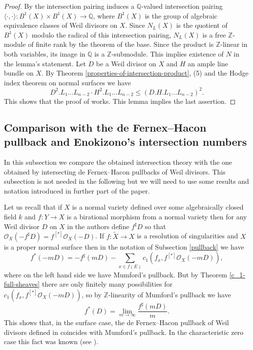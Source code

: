 \documentclass[twoside, 11pt]{article}
\theoremstyle{plain}
\theoremstyle{definition}
\theoremstyle{remark}
\newcommand{\ZZ}{{\mathbb Z}}
\newcommand{\QQ}{{\mathbb Q}}
\newcommand{\cO}{{\mathcal O}}
\begin{document}
\begin{proof}
By \cite[Lemma 1.18]{La4} the intersection pairing induces a $\QQ$-valued intersection pairing $\langle \cdot, \cdot \rangle : B^1(X)\times B^1(X)\to \QQ$, where $B^1(X)$ is the group of algebraic equivalence classes of Weil divisors on $X$. Since $N_L(X)$  is the quotient of $B^1 (X)$ modulo the radical of this intersection pairing, $N_L(X)$ is a free $\ZZ$-module of finite rank by the theorem of the base. Since the product is $\ZZ$-linear in both variables, its image in $\QQ$ is a $\ZZ$-submodule. This implies  existence of  $N$  in the lemma’s statement. 
Let $D$ be a Weil divisor on $X$ and $H$ an ample line bundle on $X$. By Theorem \ref{properties-of-intersection-product}, (5) and the Hodge index theorem on normal surfaces we have 
\[D^2.L_1...L_{n-2} \cdot H^2.L_1...L_{n-2}  \le (D.H.L_1...L_{n-2})^2.
\]
This shows that the proof of \cite[Lemma 1.19]{La4} works. This lemma implies the last assertion.  
\end{proof}

\subsection{Comparison with the de Fernex--Hacon pullback and Enokizono's intersection numbers}\label{deFernex-Hacon}

In this subsection we compare the obtained intersection theory with the one obtained by intersecting de Fernex--Hacon pullbacks of Weil divisors. This subsection is not needed in the following but we will need to use some results and notation introduced in further part of the paper.

Let us recall that if $X$ is a normal variety defined over some algebraically closed field $k$ and $f: Y\to X$ is a birational morphism from a normal variety then for any Weil divisor $D$ on $X$ in \cite[Definition 2.5]{dFH} the authors define $f^{\sharp}D$ so that $\cO_X (-f^{\sharp} D)=f^{[*]}\cO_X(-D)$.
If $f: \tilde X\to X$ is a resolution of singularities and $X$ is a proper normal surface then in
the notation of Subsection \ref{pullback} we have
$$f^*(-mD)=- f^{\sharp} (mD)-\sum _{x\in f(E)} c_1 (f_x, f^{[*]} \cO_X (-mD)), $$ 
where on the left hand side we have Mumford's pullback.
But by Theorem \ref{c_1-full-sheaves} there are only finitely many possibilities for $c_1 (f_x, f^{[*]} \cO_X (-mD))$,
so by $\ZZ$-linearity of Mumford's pullback we have
$$f^*(D)=\lim _{m\to \infty }\frac{f^{\sharp} (mD)}{m}.$$
This shows that, in the surface case, the de Fernex--Hacon pullback of Weil divisors defined in \cite[Definition 2.9]{dFH}
coincides with Mumford's pullback. In the characteristic zero case this fact was known (see \cite[Section 2]{BdFF}).
\end{document}
